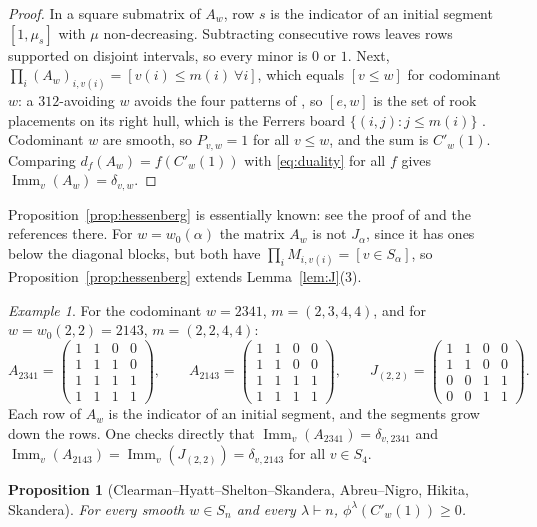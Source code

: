 \documentclass[11pt]{amsart}
\newtheorem{proposition}[theorem]{Proposition}
\theoremstyle{definition}
\theoremstyle{remark}
\newtheorem{exa}{Example}[section]
\newcommand{\Imm}{\operatorname{Imm}}
\newcommand{\Cp}[1]{C'_{#1}(1)}
\begin{document}
\begin{proof}
In a square submatrix of $A_w$, row $s$ is the indicator of an initial segment $[1,\mu_s]$ with $\mu$ non-decreasing. Subtracting consecutive rows leaves rows supported on disjoint intervals, so every minor is $0$ or $1$. Next, $\prod_i(A_w)_{i,v(i)}=[v(i)\le m(i)\ \forall i]$, which equals $[v\le w]$ for codominant $w$: a $312$-avoiding $w$ avoids the four patterns of \cite[Thm.~3.1]{Sjo}, so $[e,w]$ is the set of rook placements on its right hull, which is the Ferrers board $\{(i,j):j\le m(i)\}$ \cite[Rem.~3.4]{Sjo}. Codominant $w$ are smooth, so $P_{v,w}=1$ for all $v\le w$, and the sum is $\Cp w$. Comparing $d_f(A_w)=f(\Cp w)$ with \eqref{eq:duality} for all $f$ gives $\Imm_v(A_w)=\delta_{v,w}$.
\end{proof}

Proposition~\ref{prop:hessenberg} is essentially known: see the proof of \cite[Prop.~25]{Ska25} and the references there. For $w=w_0(\alpha)$ the matrix $A_w$ is not $J_\alpha$, since it has ones below the diagonal blocks, but both have $\prod_iM_{i,v(i)}=[v\in S_\alpha]$, so Proposition~\ref{prop:hessenberg} extends Lemma~\ref{lem:J}(3).

\begin{exa}\label{exa:hessenberg}
For the codominant $w=2341$, $m=(2,3,4,4)$, and for $w=w_0(2,2)=2143$, $m=(2,2,4,4)$:
\[
A_{2341}=\begin{pmatrix}1&1&0&0\\1&1&1&0\\1&1&1&1\\1&1&1&1\end{pmatrix},\qquad
A_{2143}=\begin{pmatrix}1&1&0&0\\1&1&0&0\\1&1&1&1\\1&1&1&1\end{pmatrix},\qquad
J_{(2,2)}=\begin{pmatrix}1&1&0&0\\1&1&0&0\\0&0&1&1\\0&0&1&1\end{pmatrix}.
\]
Each row of $A_w$ is the indicator of an initial segment, and the segments grow down the rows. One checks directly that $\Imm_v(A_{2341})=\delta_{v,2341}$ and $\Imm_v(A_{2143})=\Imm_v(J_{(2,2)})=\delta_{v,2143}$ for all $v\in S_4$.
\end{exa}

\begin{proposition}[Clearman--Hyatt--Shelton--Skandera, Abreu--Nigro, Hikita, Skandera]\label{thm:smooth}
For every smooth $w\in S_n$ and every $\lambda\vdash n$, $\phi^\lambda(\Cp w)\ge0$.
\end{proposition}
\end{document}
